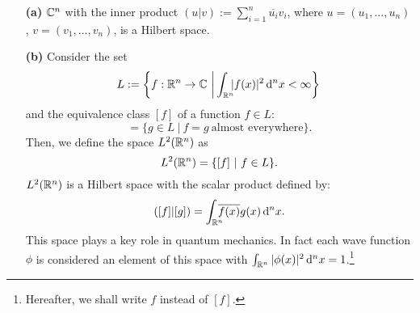  \begin{example} 
 	\begin{itemize}
 		\item[\textbf{(a)}] ${\mathbb C}^n$ with the inner product $(u|v):=\sum_{i=1}^{n}\overline{u_i}v_i$, where $u=(u_1,...,u_n)$, $v=(v_1,...,v_n)$, is a Hilbert space.
 		\item[\textbf{(b)}] Consider the set
 		\begin{equation}
 			L:=\left\{f:{\mathbb R}^n\to{\mathbb C} \ \bigg| \int_{{\mathbb R}^n}\!\!\!|f(x)|^2\,\mathrm d^n x<\infty \right\}\big.
 		\end{equation}
 		 and the equivalence class $[f]$ of a function $f\in L$: 
 		 \begin{equation}
 		 	[f]=\{g\in L\ |\ f=g\ \text{almost everywhere}\}.
 		 \end{equation}
 		 Then, we define the space $L^2({\mathbb R}^n)$ as
 		 \begin{equation}
 		 	L^2({\mathbb R}^n)=\{ [f] \ |\ f\in L \}.
 		 \end{equation}
 		 $L^2({\mathbb R}^n)$ is a Hilbert space with the scalar product defined by:
 		 \begin{equation}
 		 ([f]|[g])=\int_{{\mathbb R}^n}\!\!\!\! \overline{f(x)}g(x)\, \mathrm d^n x.
 		 \end{equation}
 		 This space plays a key role in quantum mechanics. In fact each wave function $\phi$ is considered an element of this space with $\int_{{\mathbb R}^n}|\phi(x)|^2\, \mathrm d^n x=1$.\footnote{Hereafter, we shall write $f$ instead of $[f]$.}
 	\end{itemize}
 \end{example}

